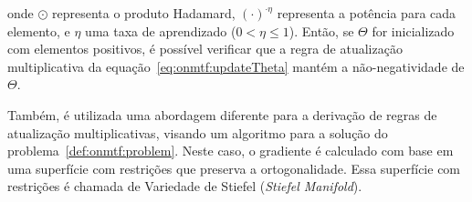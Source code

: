 \documentclass[
    12pt,                %
    oneside,            %
    a4paper,            %
    english,            %
    brazil                %
    ]{abntex2ppgsi}
\begin{document}
onde $\odot$ representa o produto Hadamard, $(\cdot)^{\cdot \eta}$ representa a potência para cada elemento, e $\eta$ uma taxa de aprendizado ($0 < \eta \leq 1$).
Então, se $\Theta$ for inicializado com elementos positivos, é possível verificar que a regra de atualização multiplicativa da equação~\ref{eq:onmtf:updateTheta} mantém a não-negatividade de $\Theta$.

Também, é utilizada uma abordagem diferente para a derivação de regras de atualização multiplicativas, visando um algoritmo para a solução do problema~\ref{def:onmtf:problem}.
Neste caso, o gradiente é calculado com base em uma superfície com restrições que preserva a ortogonalidade.
Essa superfície com restrições é chamada de Variedade de Stiefel (\textit{Stiefel Manifold}).





\end{document}
